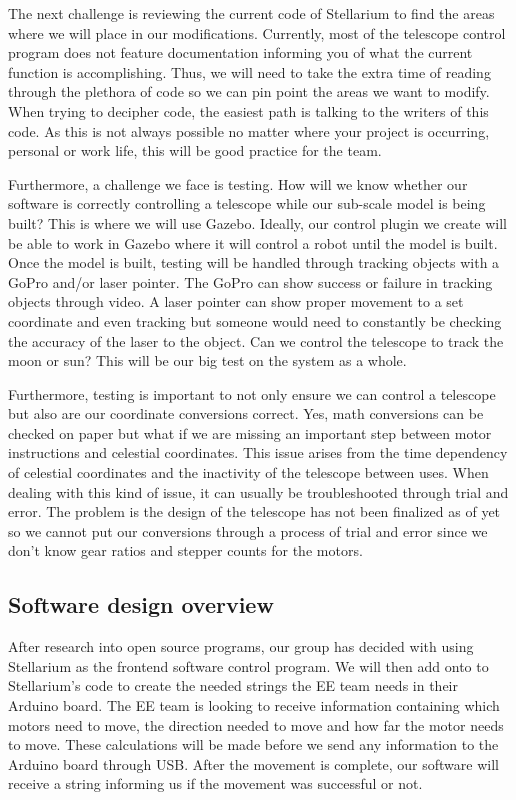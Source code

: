 \documentclass[12pt]{report}
\begin{document}
The next challenge is reviewing the current code of Stellarium to find the areas where we will place in our modifications. Currently, most of the telescope control program does not feature documentation informing you of what the current function is accomplishing. Thus, we will need to take the extra time of reading through the plethora of code so we can pin point the areas we want to modify. When trying to decipher code, the easiest path is talking to the writers of this code. As this is not always possible no matter where your project is occurring, personal or work life, this will be good practice for the team.

Furthermore, a challenge we face is testing. How will we know whether our software is correctly controlling a telescope while our sub-scale model is being built? This is where we will use Gazebo. Ideally, our control plugin we create will be able to work in Gazebo where it will control a robot until the model is built. Once the model is built, testing will be handled through tracking objects with a GoPro and/or laser pointer. The GoPro can show success or failure in tracking objects through video. A laser pointer can show proper movement to a set coordinate and even tracking but someone would need to constantly be checking the accuracy of the laser to the object. Can we control the telescope to track the moon or sun? This will be our big test on the system as a whole.

Furthermore, testing is important to not only ensure we can control a telescope but also are our coordinate conversions correct. Yes, math conversions can be checked on paper but what if we are missing an important step between motor instructions and celestial coordinates. This issue arises from the time dependency of celestial coordinates and the inactivity of the telescope between uses. When dealing with this kind of issue, it can usually be troubleshooted through trial and error. The problem is the design of the telescope has not been finalized as of yet so we cannot put our conversions through a process of trial and error since we don’t know gear ratios and stepper counts for the motors.


\subsection*{Software design overview}

After research into open source programs, our group has decided with using Stellarium as the frontend software control program. We will then add onto to Stellarium’s code to create the needed strings the EE team needs in their Arduino board. The EE team is looking to receive information containing which motors need to move, the direction needed to move and how far the motor needs to move. These calculations will be made before we send any information to the Arduino board through USB. After the movement is complete, our software will receive a string informing us if the movement was successful or not.
\end{document}
